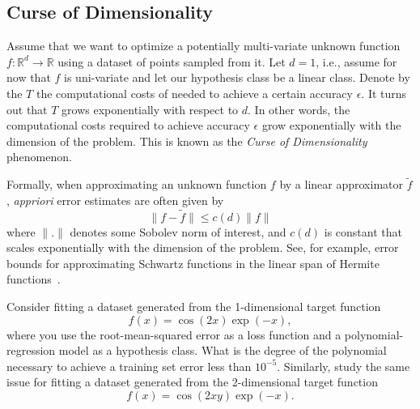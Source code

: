 \subsection{Curse of Dimensionality}
Assume that we want to optimize a potentially multi-variate unknown function $f:
\mathbb{R}^d \to \mathbb{R}$ using a dataset of
points sampled from it. Let $d=1$, i.e., assume for now that $f$ is uni-variate
and let our hypothesis class be a linear class. Denote by the $T$ the
computational costs of needed to achieve a certain accuracy $\epsilon$. It turns
out that $T$ grows exponentially with respect to $d$. In other words, the
computational costs required to achieve accuracy $\epsilon$ grow exponentially
with the dimension of the problem. This is known as the \emph{Curse of
Dimensionality} phenomenon.

Formally, when approximating an unknown function $f$ by a linear approximator
$\tilde{f}$, \emph{appriori} error estimates are often given by
\begin{equation*}
    \|f - \tilde{f}\| \leq c(d) \|f\|
\end{equation*}
where $\|.\|$ denotes some Sobolev norm of interest, and $c(d)$ is constant that
scales exponentially with the dimension of the problem. See, for example, error
bounds for approximating Schwartz functions in the linear span of Hermite
functions~\cite{Lubich:QCMD}. 
\begin{boxedexample} \complementary{\theexample}
    \label{ex:CoD_fitting}
Consider fitting a dataset generated from the 1-dimensional target function
\begin{equation*}
    f(x) = \cos(2x) \exp(-x),
\end{equation*}
where you use the root-mean-squared error as a loss function and a
polynomial-regression model as a hypothesis class. What is the degree of the
polynomial necessary to achieve a training set error less than $10^{-5}$.
Similarly, study the same issue for fitting a dataset generated from the 2-dimensional target function
\begin{equation*}
    f(x) = \cos(2x y) \exp(-x).
\end{equation*}
\end{boxedexample}

